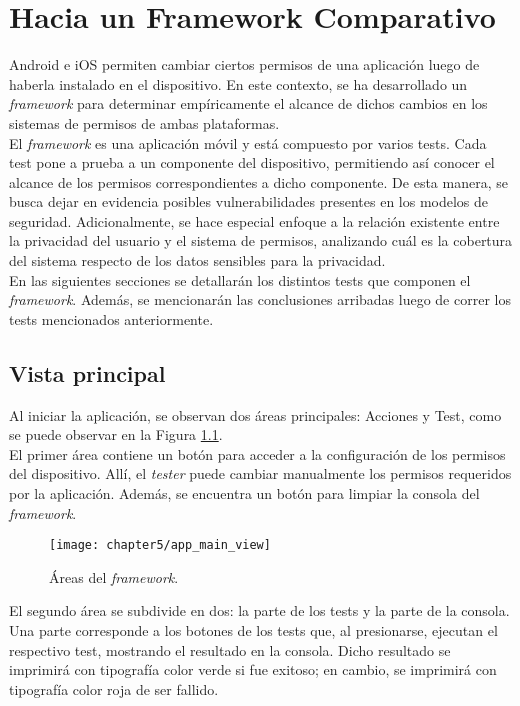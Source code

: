 \chapter{Hacia un Framework Comparativo}
Android e iOS permiten cambiar ciertos permisos de una aplicación luego de haberla instalado en el dispositivo. En este contexto, se ha desarrollado un \textit{framework} para determinar empíricamente el alcance de dichos cambios en los sistemas de permisos de ambas plataformas.\\

El \textit{framework} es una aplicación móvil y está compuesto por varios tests. Cada test pone a prueba a un componente del dispositivo, permitiendo así conocer el alcance de los permisos correspondientes a dicho componente. De esta manera, se busca dejar en evidencia posibles vulnerabilidades presentes en los modelos de seguridad. Adicionalmente, se hace especial enfoque a la relación existente entre la privacidad del usuario y el sistema de permisos, analizando cuál es la cobertura del sistema respecto de los datos sensibles para la privacidad.\\

En las siguientes secciones se detallarán los distintos tests que componen el \textit{framework}. Además, se mencionarán las conclusiones arribadas luego de correr los tests mencionados anteriormente.
\section{Vista principal} \label{sec:main-view}
Al iniciar la aplicación, se observan dos áreas principales: Acciones y Test, como se puede observar en la Figura \ref{fig:chapter05:main_view}.\\

El primer área contiene un botón para acceder a la configuración de los permisos del dispositivo. Allí, el \textit{tester} puede cambiar manualmente los permisos requeridos por la aplicación. Además, se encuentra un botón para limpiar la consola del \textit{framework}.\\

\begin{figure}[hbtp]
    \centering
	\texttt{[image: chapter5/app\_main\_view]}
	\caption{Áreas del \textit{framework}.}
	\label{fig:chapter05:main_view}
\end{figure}
El segundo área se subdivide en dos: la parte de los tests y la parte de la consola. Una parte corresponde a los botones de los tests que, al presionarse, ejecutan el respectivo test, mostrando el resultado en la consola. Dicho resultado se imprimirá con tipografía color verde si fue exitoso; en cambio, se imprimirá con tipografía color roja de ser fallido.\\

